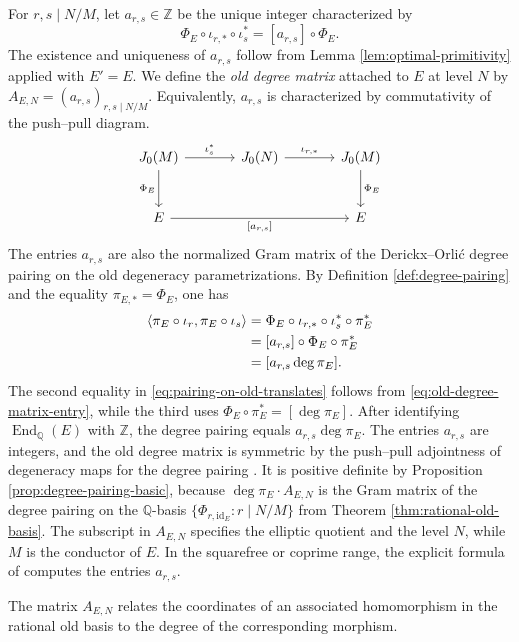 \documentclass[12pt, letterpaper]{amsart}
\theoremstyle{definition}
\theoremstyle{remark}
\newcommand{\Q}{\mathbb Q}
\newcommand{\Z}{\mathbb Z}
\newcommand{\End}{\operatorname{End}}
\numberwithin{equation}{section}
\begin{document}
For \(r,s\mid N/M\), let \(a_{r,s}\in\Z\) be the unique integer characterized by
\begin{equation}\label{eq:old-degree-matrix-entry}
 \Phi_E\circ\iota_{r,*}\circ\iota_s^*=[a_{r,s}]\circ\Phi_E.
\end{equation}
The existence and uniqueness of \(a_{r,s}\) follow from Lemma
\ref{lem:optimal-primitivity} applied with \(E'=E\).
We define the \emph{old degree matrix} attached to \(E\) at level \(N\) by
\(A_{E,N}=(a_{r,s})_{r,s\mid N/M}\). Equivalently, \(a_{r,s}\) is characterized
by commutativity of the push--pull diagram.
\[
\begin{tikzcd}[column sep=large,row sep=large]
J_0(M) \arrow[r,"\iota_s^*"] \arrow[d,"\Phi_E"'] &
J_0(N) \arrow[r,"\iota_{r,*}"] &
J_0(M) \arrow[d,"\Phi_E"] \\
E \arrow[rr,"{[a_{r,s}]}"'] && E
\end{tikzcd}
\]
The entries \(a_{r,s}\) are also the normalized Gram matrix of the Derickx--Orli\'c degree
pairing on the old degeneracy parametrizations. By Definition
\ref{def:degree-pairing} and the equality \(\pi_{E,*}=\Phi_E\), one has
\begin{align}
 \langle \pi_E\circ\iota_r,\pi_E\circ\iota_s\rangle
 &=\Phi_E\circ\iota_{r,*}\circ\iota_s^{*}\circ\pi_E^*  \notag\\
 &=[a_{r,s}]\circ\Phi_E\circ\pi_E^*                       \notag\\
 &=[a_{r,s}\deg\pi_E].
        \label{eq:pairing-on-old-translates}
\end{align}
The second equality in \eqref{eq:pairing-on-old-translates} follows from
\eqref{eq:old-degree-matrix-entry}, while the third uses
\(\Phi_E\circ\pi_E^*=[\deg\pi_E]\). After identifying
\(\End_\Q(E)\) with \(\Z\), the degree pairing equals
\(a_{r,s}\deg\pi_E\).
The entries \(a_{r,s}\) are integers, and the old degree matrix is symmetric by
the push--pull adjointness of degeneracy maps for the degree pairing
\cite{DerickxOrlic}. It is positive definite by Proposition
\ref{prop:degree-pairing-basic}, because \(\deg\pi_E\cdot A_{E,N}\) is the Gram
matrix of the degree pairing on the \(\Q\)-basis
\(\{\Phi_{r,\mathrm{id}_E}:r\mid N/M\}\) from Theorem
\ref{thm:rational-old-basis}.
The subscript in \(A_{E,N}\) specifies the
elliptic quotient and the level \(N\), while \(M\) is the conductor of \(E\). In
the squarefree or coprime range, the explicit formula of
\cite{DerickxOrlic} computes the entries \(a_{r,s}\).

The matrix \(A_{E,N}\) relates the coordinates of an associated homomorphism
in the rational old basis to the degree of the corresponding morphism.
\end{document}
